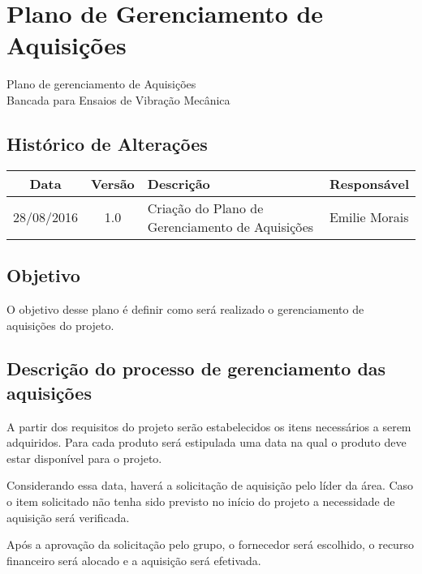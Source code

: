 \chapter{Plano de Gerenciamento de Aquisições}
	\label{plano_de_aquisicoes}    						
% 	


\begin{center}
 {\large Plano de gerenciamento de Aquisições}\\[0.2cm]
 {Bancada para Ensaios de Vibração Mecânica}\\
 \end{center}
 
 \section*{Histórico de Alterações}
\begin{table}[h]
\centering
\begin{tabular}{|c|c|p{6cm}|p{5cm}|}

Data & Versão & Descrição & Responsável\\
\hline                               
28/08/2016 & 1.0 & Criação do Plano de Gerenciamento de Aquisições & Emilie Morais\\
\hline
\end{tabular}
\end{table}

\section*{Objetivo}
  O objetivo desse plano é definir como será realizado o gerenciamento de aquisições do projeto.
  
\section*{Descrição do processo de gerenciamento das aquisições}
 A partir dos requisitos do projeto serão estabelecidos os itens necessários a serem adquiridos. Para cada produto será estipulada uma data na qual o produto deve estar disponível para o projeto. 
 
Considerando essa data, haverá a solicitação de aquisição pelo líder da área. Caso o item solicitado não tenha sido previsto no início do projeto a necessidade de aquisição será verificada. 

Após a aprovação da solicitação pelo grupo, o fornecedor será escolhido, o recurso financeiro será alocado e a aquisição será efetivada.

